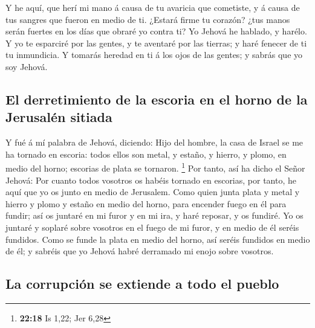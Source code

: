  Y he aquí, que herí mi mano á causa de tu avaricia que
cometiste, y á causa de tus sangres que fueron en medio de ti.
 ¿Estará firme tu corazón? ¿tus manos serán fuertes en
los días que obraré yo contra ti? Yo Jehová he hablado, y harélo.
 Y yo te esparciré por las gentes, y te aventaré por las
tierras; y haré fenecer de ti tu inmundicia.  Y tomarás
heredad en ti á los ojos de las gentes; y sabrás que yo soy Jehová.

\hypertarget{el-derretimiento-de-la-escoria-en-el-horno-de-la-jerusaluxe9n-sitiada}{%
\subsection{El derretimiento de la escoria en el horno de la Jerusalén
sitiada}\label{el-derretimiento-de-la-escoria-en-el-horno-de-la-jerusaluxe9n-sitiada}}

 Y fué á mí palabra de Jehová, diciendo: 
Hijo del hombre, la casa de Israel se me ha tornado en escoria: todos
ellos son metal, y estaño, y hierro, y plomo, en medio del horno;
escorias de plata se tornaron. \footnote{\textbf{22:18} Is 1,22; Jer
  6,28}  Por tanto, así ha dicho el Señor Jehová: Por
cuanto todos vosotros os habéis tornado en escorias, por tanto, he aquí
que yo os junto en medio de Jerusalem.  Como quien junta
plata y metal y hierro y plomo y estaño en medio del horno, para
encender fuego en él para fundir; así os juntaré en mi furor y en mi
ira, y haré reposar, y os fundiré.  Yo os juntaré y
soplaré sobre vosotros en el fuego de mi furor, y en medio de él seréis
fundidos.  Como se funde la plata en medio del horno, así
seréis fundidos en medio de él; y sabréis que yo Jehová habré derramado
mi enojo sobre vosotros.

\hypertarget{la-corrupciuxf3n-se-extiende-a-todo-el-pueblo}{%
\subsection{La corrupción se extiende a todo el
pueblo}\label{la-corrupciuxf3n-se-extiende-a-todo-el-pueblo}}

